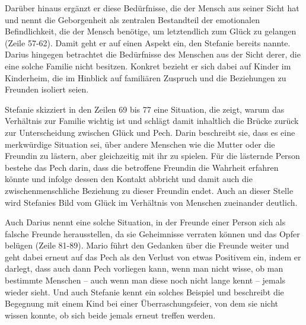 Darüber hinaus ergänzt er diese Bedürfnisse, die der Mensch aus seiner Sicht hat und nennt die Geborgenheit als zentralen Bestandteil der emotionalen Befindlichkeit, die der Mensch benötige, um letztendlich zum Glück zu gelangen (Zeile 57-62). 
Damit geht er auf einen Aspekt ein, den Stefanie bereits nannte. 
Darius hingegen betrachtet die Bedürfnisse des Menschen aus der Sicht derer, die eine solche Familie nicht besitzen. 
Konkret bezieht er sich dabei auf Kinder im Kinderheim, die im Hinblick auf familiären Zuspruch und die Beziehungen zu Freunden isoliert seien.
 
Stefanie skizziert in den Zeilen 69 bis 77 eine Situation, die zeigt, warum das Verhältnis zur Familie wichtig ist und schlägt damit inhaltlich die Brücke zurück zur Unterscheidung zwischen Glück und Pech. 
Darin beschreibt sie, dass es eine merkwürdige Situation sei, über andere Menschen wie die Mutter oder die Freundin zu lästern, aber gleichzeitig mit ihr zu spielen. 
Für die lästernde Person bestehe das Pech darin, dass die betroffene Freundin die Wahrheit erfahren könnte und infolge dessen den Kontakt abbricht und damit auch die zwischenmenschliche Beziehung zu dieser Freundin endet. 
Auch an dieser Stelle wird Stefanies Bild vom Glück im Verhältnis von Menschen zueinander deutlich. 

Auch Darius nennt eine solche Situation, in der Freunde einer Person sich als falsche Freunde herausstellen, da sie Geheimnisse verraten können und das Opfer belügen (Zeile 81-89).
Mario führt den Gedanken über die Freunde weiter und geht dabei erneut auf das Pech als den Verlust von etwas Positivem ein, indem er darlegt, dass auch dann Pech vorliegen kann, wenn man nicht wisse, ob man bestimmte Menschen -- auch wenn man diese noch nicht lange kennt -- jemals wieder sieht. 
Und auch Stefanie kennt ein solches Beispiel und beschreibt die Begegnung mit einem Kind bei einer Überraschungsfeier, von dem sie nicht wissen konnte, ob sich beide jemals erneut treffen werden.

